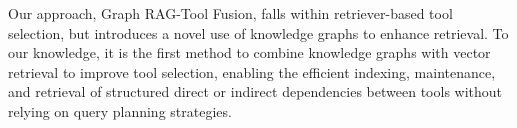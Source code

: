 Our approach, Graph RAG-Tool Fusion, falls within retriever-based tool selection, but introduces a novel use of knowledge graphs to enhance retrieval. To our knowledge, it is the first method to combine knowledge graphs with vector retrieval to improve tool selection, enabling the efficient indexing, maintenance, and retrieval of structured direct or indirect dependencies between tools without relying on query planning strategies.